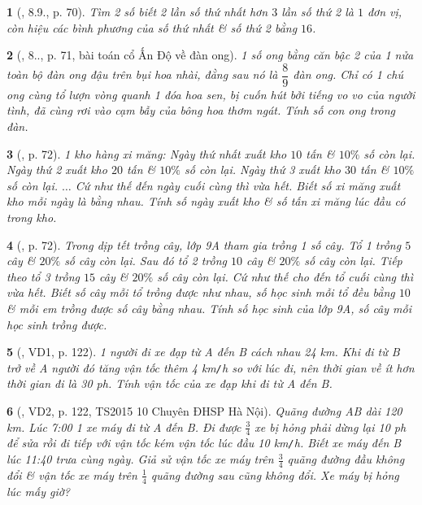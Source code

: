 \documentclass{article}
\newtheorem{baitoan}{}
\begin{document}
\begin{baitoan}[\cite{Binh_boi_duong_Toan_9_tap_2}, 8.9., p. 70]
	Tìm 2 số biết 2 lần số thứ nhất hơn $3$ lần số thứ 2 là $1$ đơn vị, còn hiệu các bình phương của số thứ nhất \& số thứ 2 bằng $16$.
\end{baitoan}

\begin{baitoan}[\cite{Binh_boi_duong_Toan_9_tap_2}, 8.., p. 71, bài toán cổ Ấn Độ về đàn ong]
	1 số ong bằng căn bậc 2 của 1 nửa toàn bộ đàn ong đậu trên bụi hoa nhài, đằng sau nó là $\dfrac{8}{9}$ đàn ong. Chỉ có 1 chú ong cùng tổ lượn vòng quanh 1 đóa hoa sen, bị cuốn hút bởi tiếng vo vo của người tình, đã cùng rơi vào cạm bẫy của bông hoa thơm ngát. Tính số con ong trong đàn.
\end{baitoan}

\begin{baitoan}[\cite{Binh_boi_duong_Toan_9_tap_2}, p. 72]
	1 kho hàng xi măng: Ngày thứ nhất xuất kho $10$ tấn \& $10\%$ số còn lại. Ngày thứ 2 xuất kho $20$ tấn \& $10\%$ số còn lại. Ngày thứ 3 xuất kho $30$ tấn \& $10\%$ số còn lại. $\ldots$ Cứ như thế đến ngày cuối cùng thì vừa hết. Biết số xi măng xuất kho mỗi ngày là bằng nhau. Tính số ngày xuất kho \& số tấn xi măng lúc đầu có trong kho.
\end{baitoan}

\begin{baitoan}[\cite{Binh_boi_duong_Toan_9_tap_2}, p. 72]
	Trong dịp tết trồng cây, lớp 9A tham gia trồng 1 số cây. Tổ 1 trồng $5$ cây \& $20\%$ số cây còn lại. Sau đó tổ 2 trồng $10$ cây \& $20\%$ số cây còn lại. Tiếp theo tổ 3 trồng $15$ cây \& $20\%$ số cây còn lại. Cứ như thế cho đến tổ cuối cùng thì vừa hết. Biết số cây mỗi tổ trồng được như nhau, số học sinh mỗi tổ đều bằng $10$ \& mỗi em trồng được số cây bằng nhau. Tính số học sinh của lớp 9A, số cây mỗi học sinh trồng được.
\end{baitoan}

\begin{baitoan}[\cite{Kien_dai_so_9}, VD1, p. 122]
	1 người đi xe đạp từ A đến B cách nhau {\rm24 km}. Khi đi từ B trở về A người đó tăng vận tốc thêm {\rm4 km{\tt/}h} so với lúc đi, nên thời gian về ít hơn thời gian đi là {\rm30 ph}. Tính vận tốc của xe đạp khi đi từ A đến B.
\end{baitoan}

\begin{baitoan}[\cite{Kien_dai_so_9}, VD2, p. 122, TS2015 10 Chuyên ĐHSP Hà Nội]
	Quãng đường AB dài {\rm120 km}. Lúc {\rm7:00} 1 xe máy đi từ A đến B. Đi được $\frac{3}{4}$ xe bị hỏng phải dừng lại {\rm10 ph} để sửa rồi đi tiếp với vận tốc kém vận tốc lúc đầu {\rm10 km{\tt/}h}. Biết xe máy đến B lúc {\rm11:40} trưa cùng ngày. Giả sử vận tốc xe máy trên $\frac{3}{4}$ quãng đường đầu không đổi \& vận tốc xe máy trên $\frac{1}{4}$ quãng đường sau cũng không đổi. Xe máy bị hỏng lúc mấy giờ?
\end{baitoan}
\end{document}
